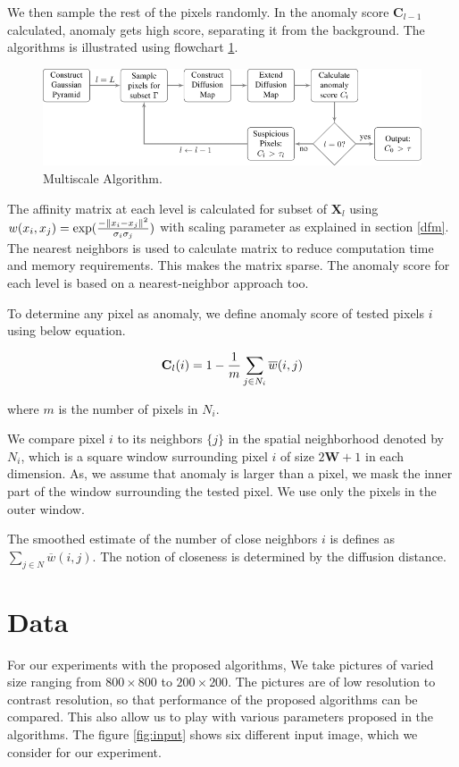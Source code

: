 We then sample the rest of the  pixels randomly. In the anomaly score $\mathbf{C}_{l-1}$ calculated, anomaly gets high score, separating it from the background. The algorithms is illustrated using flowchart \ref{algo}.

\begin{figure}[ht]
\begin{center}
\includegraphics[width=\textwidth]{./Figures/algo.png}
\caption {Multiscale Algorithm.}
\label{algo}
\end{center}
\end{figure}

The affinity matrix at each level is calculated for subset of $\mathbf{X}_l$ using $w(x_{i},x_{j})=\exp({-\Vert x_{i}-x_{j}\Vert^{2}\over\sigma_{i}\sigma_{j}})$ with scaling parameter as explained in section \ref{dfm}. The nearest neighbors is used to calculate matrix to reduce computation time and memory requirements. This makes the matrix sparse. The anomaly score for each level is  based on a nearest-neighbor approach too. 

To determine any pixel as anomaly, we define anomaly score of tested pixels $i$ using below equation.

\begin{equation}
\mathbf{C}_{l}(i)=1-{1\over m}\sum_{j\in N_{i}}\overline{w}(i,j)
\end{equation}

where $m$ is the number of pixels in $N_i$.

We compare pixel $i$ to its neighbors $\{j\}$ in the spatial neighborhood denoted by $N_{i}$, which is a square window surrounding pixel $i$ of size $2\mathbf{W}+1$ in each dimension. As, we assume that anomaly is larger than a pixel, we mask the inner part of the window surrounding the tested pixel. We use only the pixels in the outer window.

The smoothed estimate of the number of close neighbors $i$ is defines as $\sum_{j\in N}\overline{w}(i,j)$. The notion of closeness is determined by the diffusion distance.

\section{Data}
\label{C5:Dat}
For our experiments with the proposed algorithms, We take pictures of varied size ranging from $800\times800$ to $200\times200$. The pictures are of low resolution to contrast resolution, so that performance of the proposed algorithms can be compared. This also allow us to play with various parameters proposed in the algorithms. The figure \ref{fig:input} shows six different input image, which we consider for our experiment.
 
